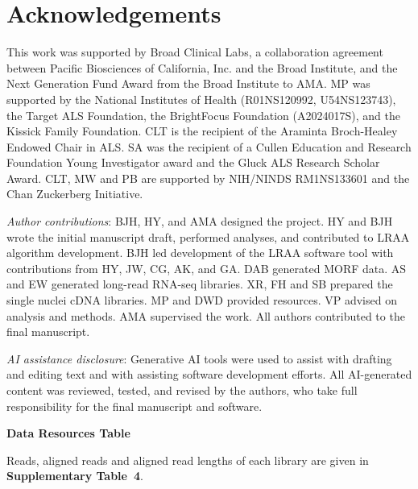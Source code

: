 \section{Acknowledgements}\label{acknowledgements}

This work was supported by Broad Clinical Labs, a collaboration agreement between Pacific Biosciences of California, Inc. and the Broad Institute, and the Next Generation Fund Award from the Broad Institute to AMA. MP was supported by the National Institutes of Health (R01NS120992, U54NS123743), the Target ALS Foundation, the BrightFocus Foundation (A2024017S), and the Kissick Family Foundation. CLT is the recipient of the Araminta Broch-Healey Endowed Chair in ALS. SA was the recipient of a Cullen Education and Research Foundation Young Investigator award and the Gluck ALS Research Scholar Award. CLT, MW and PB are supported by NIH/NINDS RM1NS133601 and the Chan Zuckerberg Initiative.

\emph{Author contributions}: BJH, HY, and AMA designed the project. HY and BJH wrote the initial manuscript draft, performed analyses, and contributed to LRAA algorithm development. BJH led development of the LRAA software tool with contributions from HY, JW, CG, AK, and GA. DAB generated MORF data. AS and EW generated long-read RNA-seq libraries. XR, FH and SB prepared the single nuclei cDNA libraries. MP and DWD provided resources. VP advised on analysis and methods. AMA supervised the work. All authors contributed to the final manuscript.

\emph{AI assistance disclosure}: Generative AI tools were used to assist with drafting and editing text and with assisting software development efforts. All AI-generated content was reviewed, tested, and revised by the authors, who take full responsibility for the final manuscript and software.

\textbf{Data Resources Table}

Reads, aligned reads and aligned read lengths of each library are given in \textbf{Supplementary Table~4}.

